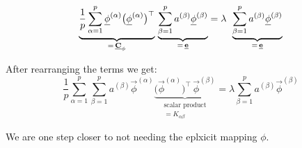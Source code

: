 \begin{frame}{\subsubsecname}



\begin{equation}
\underbrace{\frac{1}{p} \sum_{\alpha=1}^{p} \vec{\phi}^{(\alpha)} \big(\vec{\phi}^{(\alpha)}\big)^\top 
\vphantom{\sum^{p}_{\beta=1}}
}_{=\,\vec C_{\phi}}
 \, 
\underbrace{\sum^{p}_{\beta=1} a^{(\beta)} \vec{\phi}^{(\beta)}}_{=\,\vec e}
 = \lambda \;\,
\underbrace{\sum^{p}_{\beta=1} a^{(\beta)} \vec{\phi}^{(\beta)}}_{=\,\vec e}
\end{equation}

\pause

After rearranging the terms we get:
\begin{equation} \label{eq:eig2}
\frac{1}{p} \sum_{\alpha=1}^{p} \sum^{p}_{\beta=1} 
a^{(\beta)} \vec{\phi}^{(\alpha)}
\underbrace{
 \big(\vec{\phi}^{(\alpha)}\big)^\top  \,  \vec{\phi}^{(\beta)}
}_{\substack{\text{scalar product}\\ = K_{\alpha\beta}}}
 = \lambda 
\sum^{p}_{\beta=1} a^{(\beta)} \vec{\phi}^{(\beta)}
\end{equation}

We are one step closer to not needing the eplxicit mapping $\phi$.

\end{frame}

